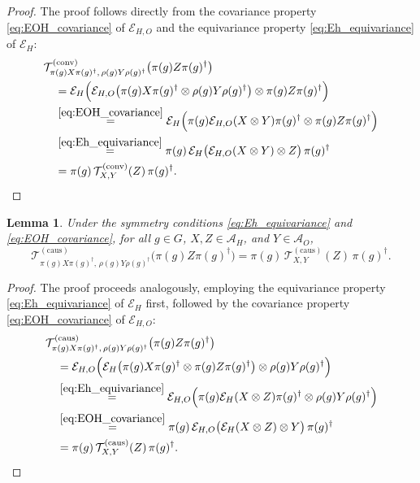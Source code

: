 \documentclass[12pt,a4paper]{article}
\newtheorem{lemma}[theorem]{Lemma}
\begin{document}
\begin{proof}
The proof follows directly from the covariance property \eqref{eq:EOH_covariance} of \(\mathcal{E}_{H,O}\) and the equivariance property \eqref{eq:Eh_equivariance} of \(\mathcal{E}_H\):
\[
\begin{aligned}
&\mathcal{T}_{\pi(g) X \pi(g)^\dagger, \, \rho(g) Y \rho(g)^\dagger}^{(\text{conv})}\big( \pi(g) Z \pi(g)^\dagger \big) \\
&\quad = \mathcal{E}_H\Big( \mathcal{E}_{H,O}\big( \pi(g) X \pi(g)^\dagger \otimes \rho(g) Y \rho(g)^\dagger \big) \otimes \pi(g) Z \pi(g)^\dagger \Big) \\
&\quad \stackrel{ {\eqref{eq:EOH_covariance}}}{=} \mathcal{E}_H\Big( \pi(g) \mathcal{E}_{H,O}(X \otimes Y) \pi(g)^\dagger \otimes \pi(g) Z \pi(g)^\dagger \Big) \\
&\quad \stackrel{ {\eqref{eq:Eh_equivariance}}}{=} \pi(g) \, \mathcal{E}_H\big( \mathcal{E}_{H,O}(X \otimes Y) \otimes Z \big) \, \pi(g)^\dagger \\
&\quad = \pi(g) \, \mathcal{T}_{X,Y}^{(\text{conv})}(Z) \, \pi(g)^\dagger.
\end{aligned}
\]
\end{proof}

\begin{lemma}\label{lem:caus_cov}
Under the symmetry conditions \eqref{eq:Eh_equivariance} and \eqref{eq:EOH_covariance}, for all \(g \in G\), \(X, Z \in \mathcal{A}_H\), and \(Y \in \mathcal{A}_O\),
\begin{equation}
\mathcal{T}_{\pi(g) X \pi(g)^\dagger, \, \rho(g) Y \rho(g)^\dagger}^{(\text{caus})}\big( \pi(g) Z \pi(g)^\dagger \big) = \pi(g) \, \mathcal{T}_{X,Y}^{(\text{caus})}(Z) \, \pi(g)^\dagger.
\label{eq:caus_covariance}
\end{equation}
\end{lemma}

\begin{proof}
The proof proceeds analogously, employing the equivariance property \eqref{eq:Eh_equivariance} of \(\mathcal{E}_H\) first, followed by the covariance property \eqref{eq:EOH_covariance} of \(\mathcal{E}_{H,O}\):
\[
\begin{aligned}
&\mathcal{T}_{\pi(g) X \pi(g)^\dagger, \, \rho(g) Y \rho(g)^\dagger}^{(\text{caus})}\big( \pi(g) Z \pi(g)^\dagger \big) \\
&\quad = \mathcal{E}_{H,O}\Big( \mathcal{E}_H\big( \pi(g) X \pi(g)^\dagger \otimes \pi(g) Z \pi(g)^\dagger \big) \otimes \rho(g) Y \rho(g)^\dagger \Big) \\
&\quad \stackrel{{\eqref{eq:Eh_equivariance}}}{=} \mathcal{E}_{H,O}\Big( \pi(g) \mathcal{E}_H(X \otimes Z) \pi(g)^\dagger \otimes \rho(g) Y \rho(g)^\dagger \Big) \\
&\quad \stackrel{{\eqref{eq:EOH_covariance}}}{=} \pi(g) \, \mathcal{E}_{H,O}\big( \mathcal{E}_H(X \otimes Z) \otimes Y \big) \, \pi(g)^\dagger \\
&\quad = \pi(g) \, \mathcal{T}_{X,Y}^{(\text{caus})}(Z) \, \pi(g)^\dagger.
\end{aligned}
\]
\end{proof}
\end{document}
